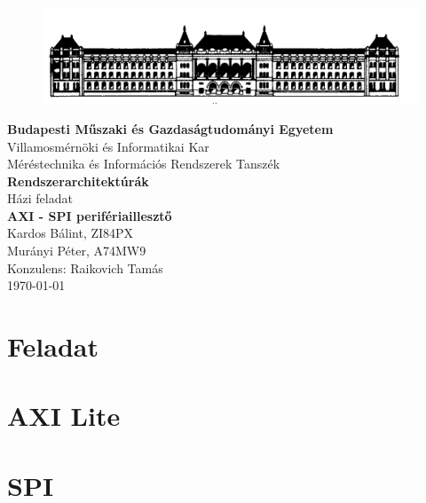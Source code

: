 \documentclass[a4paper,11pt]{article}
\begin{document}
\sloppy

\begin{titlepage}
\begin{center}
\begin{figure}[t!]
	\begin{center}
	\includegraphics[scale=0.2]{bme.png}
	\label{a:bme}
	\end{center}
\end{figure}
\textbf{{Budapesti Műszaki és Gazdaságtudományi Egyetem}}\\
Villamosmérnöki és Informatikai Kar\\
Méréstechnika és Információs Rendszerek Tanszék\\
\vfill
\huge\textbf{{Rendszerarchitektúrák}}\\[3mm]
\Large{Házi feladat}\\[3mm]
\Large\textbf{{AXI - SPI perifériaillesztő}}\\
\vfill
\Large{Kardos Bálint, ZI84PX}\\
\Large{Murányi Péter, A74MW9}\\
\Large{Konzulens: Raikovich Tamás}\\
\vfill
\today \\

\end{center}
\end{titlepage}

\tableofcontents
\thispagestyle{empty}
\clearpage
\setlength{\parindent}{0em}
\setlength{\parskip}{1em}

\setcounter{page}{1}
\setcounter{tocdepth}{4}
\setcounter{secnumdepth}{4}


\section{Feladat}


\section{AXI Lite}

\section{SPI}
\end{document}
